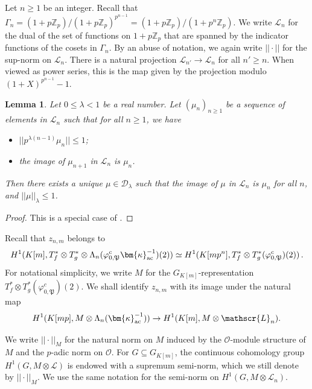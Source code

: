 \documentclass{amsart}
\numberwithin{equation}{section}
\newtheorem{lemma}[theorem]{Lemma}
\newcommand{\frk}{\mathfrak}
\newcommand{\Zp}{\mathbb{Z}_p}
\newcommand{\cO}{\mathcal{O}}
\newcommand{\ac}{\textup{ac}}
\newcommand{\bk}{(\bm{\kappa}_{\ac}^{-1})}
\newcommand{\cC}{\mathcal{C}}
\newcommand{\cD}{\mathcal{D}}
\newcommand{\sL}{\mathscr{L}}
\newcommand{\R}{{\mathbb R}}
\begin{document}
 
 Let $n\ge1$ be an integer. Recall that $\Gamma_n=(1+p\Zp)/(1+p\Zp)^{p^{n-1}}=(1+p\Zp)/(1+p^n\Zp)$. We write $\sL_n$ for the dual of the set of functions on $1+p\Zp$ that are spanned by the indicator functions of the cosets in $\Gamma_n$. By an abuse of notation, we again write $||\cdot||$ for the sup-norm on $\sL_n$. There is a natural projection $\sL_{n'}\to \sL_n$ for all $n'\ge n$. When viewed as power series, this is the map given by the projection modulo $(1+X)^{p^{n-1}}-1$. 




\begin{lemma}\label{lem:characterizing-distributions}
    Let $0\le \lambda<1$ be a real number. Let $(\mu_n)_{n\ge1}$ be a sequence of elements in $\sL_n$ such that for all $n\ge1$, we have
    \begin{itemize}
        \item[a)] $||p^{\lambda (n-1)}\mu_n||\le 1$;
        \item[b)] the image of $\mu_{n+1}$ in $\sL_n$ is $\mu_n$.
    \end{itemize}
    Then there exists a unique $\mu\in\cD_{\lambda}$ such that the image of $\mu$ in $\sL_n$ is $\mu_n$ for all $n$, and $||\mu||_\lambda\le 1$.
\end{lemma}
\begin{proof}
    This is a special case of \cite[Lemma~2.2]{BFSuper}.
\end{proof}


 
 Recall that $z_{n,m}$ belongs to 
\[
H^1(K[m],T_f^\ast\otimes T_g^\ast\otimes \Lambda_n(\varphi_{0,\frk{P}}^c\bm{\kappa}_{\ac}^{-1})(2))
\simeq H^1(K[mp^{n}],T_f^\ast\otimes T_g^\ast(\varphi_{0,\frk{P}}^c)(2))\,.
\]
For notational simplicity, we write $M$ for the $G_{K[m]}$-representation $T_f^\ast\otimes T_g^\ast(\varphi_{0,\frk{P}}^c)(2)$. We shall identify $z_{n,m}$ with its image under the natural map
\[
H^1(K[mp],M\otimes \Lambda_n\bk)\to H^1(K[m],M\otimes\sL_n).
\]


 We write $||\cdot||_M$ for the natural norm on $M$ induced by the $\cO$-module structure of $M$ and the $p$-adic norm on $\cO$. For $G\subseteq G_{K[m]}$, the continuous cohomology group $H^1(G,M\otimes \sL)$ is endowed with a supremum semi-norm, which we still denote by $||\cdot||_M$. We use the same notation for the semi-norm on $H^1(G,M\otimes \sL_n)$.

\end{document}
